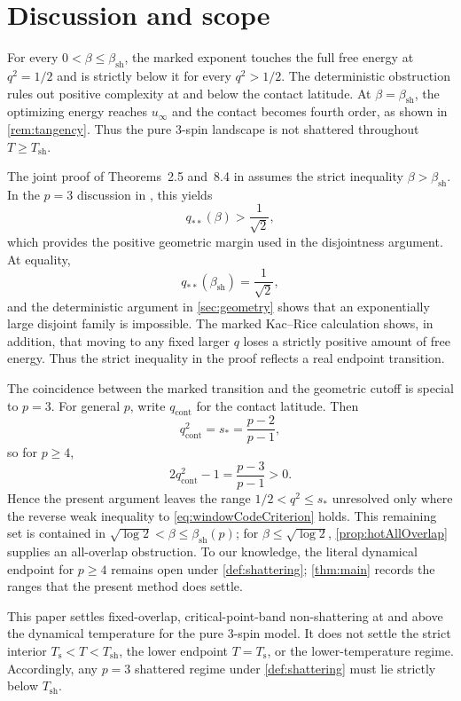 \documentclass[11pt,reqno]{amsart}
\numberwithin{equation}{section}
\theoremstyle{plain}
\theoremstyle{definition}
\theoremstyle{remark}
\newcommand{\1}{\mathbf 1}
\newcommand{\Tsh}{T_{\mathrm{sh}}}
\newcommand{\Ts}{T_{\mathrm{s}}}
\begin{document}
\section{Discussion and scope}\label{sec:discussion}

For every \(0<\beta\leq\beta_{\mathrm{sh}}\), the marked exponent
touches the full free energy at \(q^2=1/2\) and is strictly below it for
every \(q^2>1/2\).  The deterministic obstruction rules out positive
complexity at and below the contact latitude.  At
\(\beta=\beta_{\mathrm{sh}}\), the optimizing energy reaches
\(u_\infty\) and the contact becomes fourth order, as shown in
\cref{rem:tangency}.  Thus the pure \(3\)-spin landscape is not
shattered throughout \(T\geq T_{\mathrm{sh}}\).

The joint proof of Theorems~2.5 and~8.4 in
\cite[Section~5]{BenArousJagannath2024} assumes the strict inequality
\(\beta>\beta_{\mathrm{sh}}\).  In the \(p=3\) discussion in
\cite[Section~8]{BenArousJagannath2024}, this yields
\[
 q_{**}(\beta)>\frac1{\sqrt2},
\]
which provides the positive geometric margin used in the disjointness
argument.  At equality,
\[
 q_{**}(\beta_{\mathrm{sh}})=\frac1{\sqrt2},
\]
and the deterministic argument in \cref{sec:geometry} shows that an exponentially large disjoint family is impossible.  The marked Kac--Rice calculation shows, in addition, that moving to any fixed larger \(q\) loses a strictly positive amount of free energy.  Thus the strict inequality in the proof reflects a real endpoint transition.

The coincidence between the marked transition and the geometric cutoff
is special to \(p=3\).  For general \(p\), write \(q_{\mathrm{cont}}\)
for the contact latitude.  Then
\[
 q_{\mathrm{cont}}^2=s_* =\frac{p-2}{p-1},
\]
so for \(p\geq4\),
\[
 2q_{\mathrm{cont}}^2-1=\frac{p-3}{p-1}>0.
\]
Hence the present argument leaves the range
\(1/2<q^2\leq s_*\) unresolved only where the reverse weak inequality
to \eqref{eq:windowCodeCriterion} holds.  This remaining set is
contained in \(\sqrt{\log2}<\beta\leq\beta_{\mathrm{sh}}(p)\); for
\(\beta\leq\sqrt{\log2}\), \cref{prop:hotAllOverlap} supplies an
all-overlap obstruction.  To our knowledge, the literal
dynamical endpoint for \(p\geq4\) remains open under
\cref{def:shattering}; \cref{thm:main} records the ranges that the
present method does settle.

This paper settles fixed-overlap, critical-point-band non-shattering at
and above the dynamical temperature for the pure \(3\)-spin model.  It
does not settle the strict interior \(\Ts<T<\Tsh\), the lower endpoint
\(T=\Ts\), or the lower-temperature regime.  Accordingly, any \(p=3\)
shattered regime under \cref{def:shattering} must lie strictly below
\(\Tsh\).
\end{document}
